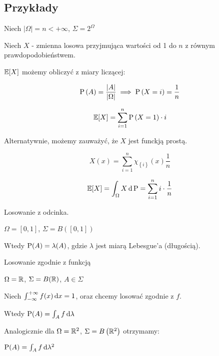 \subsection{Przykłady}

\begin{example}

    Niech \( \left| \Omega \right| = n < +\infty \), \( \Sigma = 2^{\Omega} \)

    Niech \( X \) - zmienna losowa przyjmująca wartości od 1 do \( n \) z równym prawdopodobieństwem.

    \( \expected{X} \) możemy obliczyć z miary liczącej:

    \[ 
        \operatorname{P} \left( A \right) = \frac{ \left| A \right| }{ \left| \Omega \right| } \implies \operatorname{P} \left( X = i \right) = \frac{1}{n} 
    \]

    \[ 
        \expected{X} = \sum_{i = 1}^{n} \prob \left( X = 1 \right) \cdot i 
    \]

    Alternatywnie, możemy zauważyć, że \( X \) jest funckją prostą.

    \[ 
        X \left( x \right) = \sum_{i = 1}^{n} \chi_{\left\{ i \right\}}\left( x \right) \frac{1}{n} 
    \]

    \[ 
        \expected{X} = \int_{\Omega} X \diff \prob = \sum_{i=1}^{n} i \cdot \frac{1}{n} 
    \]

\end{example}

\begin{example}
    Losowanie z odcinka.

    \( \Omega = [ 0, 1] \), \( \Sigma = B\left([0, 1] \right) \)

    Wtedy \( \operatorname{P}(A) = \lambda(A) \), gdzie \( \lambda \) jest miarą Lebesgue'a (długością).
    
\end{example}

\begin{example}
    Losowanie zgodnie z funkcją

    \( \Omega = \mathbb{R} \), \( \Sigma = B(\mathbb{R}) \), \( A \in \Sigma \)

    Niech \( \int_{-\infty}^{+\infty} f(x) \mathop{}\!\mathrm{d} x = 1 \), oraz chcemy losować zgodnie z \( f \).

    Wtedy \( \operatorname{P}(A) = \int_A f \mathop{}\!\mathrm{d} \lambda \) 

    Analogicznie dla \( \Omega = \mathbb{R}^2 \), \( \Sigma = B\left( \mathbb{R}^2 \right) \) otrzymamy:

    \( \operatorname{P}(A) = \int_A f \mathop{}\!\mathrm{d} \lambda^2 \)

\end{example}

